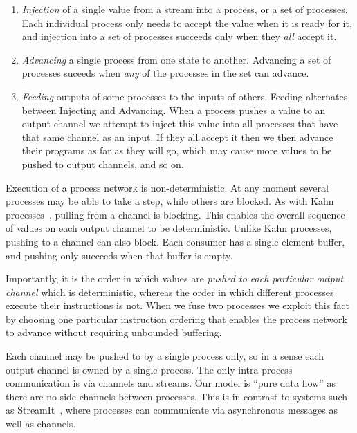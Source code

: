 \begin{enumerate}
\item \emph{Injection} of a single value from a stream into a process, or a set of processes. Each individual process only needs to accept the value when it is ready for it, and injection into a set of processes succeeds only when they \emph{all} accept it.

\item \emph{Advancing} a single process from one state to another. Advancing a set of processes suceeds when \emph{any} of the processes in the set can advance.

\item \emph{Feeding} outputs of some processes to the inputs of others. Feeding alternates between Injecting and Advancing. When a process pushes a value to an output channel we attempt to inject this value into all processes that have that same channel as an input. If they all accept it then we then advance their programs as far as they will go, which may cause more values to be pushed to output channels, and so on.
\end{enumerate}

Execution of a process network is non-deterministic. At any moment several processes may be able to take a step, while others are blocked. As with Kahn processes~\cite{kahn1976coroutines}, pulling from a channel is blocking. This enables the overall sequence of values on each output channel to be deterministic. Unlike Kahn processes, pushing to a channel can also block. Each consumer has a single element buffer, and pushing only succeeds when that buffer is empty.


Importantly, it is the order in which values are \emph{pushed to each particular output channel} which is deterministic, whereas the order in which different processes execute their instructions is not. When we fuse two processes we exploit this fact by choosing one particular instruction ordering that enables the process network to advance without requiring unbounded buffering.

Each channel may be pushed to by a single process only, so in a sense each output channel is owned by a single process. The only intra-process communication is via channels and streams. Our model is ``pure data flow'' as there are no side-channels between processes. This is in contrast to systems such as StreamIt~\cite{thies2002streamit}, where processes can communicate via asynchronous messages as well as channels.


